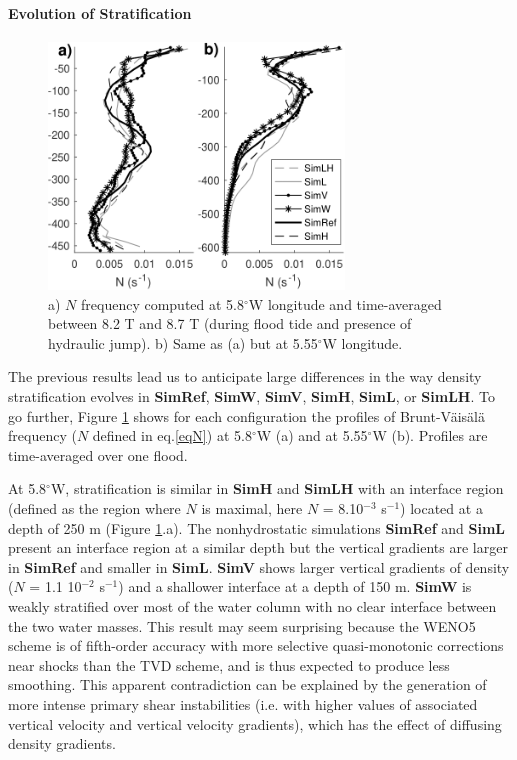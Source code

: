 \paragraph{Evolution of Stratification}

\begin{figure}[!h]
\centering
  \includegraphics[width=0.7\textwidth]{./GBR2D/figure13.png}
  \caption [$N$ frequency ime-averaged during flood tide.]{a) $N$ frequency computed at 5.8$^\circ$W longitude and time-averaged between 8.2 T and 8.7 T (during flood tide and presence of hydraulic jump). b) Same as (a) but at 5.55$^\circ$W longitude.}
	\label{fig_sensnum2}
\end{figure}

The previous results lead us to anticipate large differences in the way density stratification evolves in \textbf{SimRef}, \textbf{SimW}, \textbf{SimV}, \textbf{SimH}, \textbf{SimL}, or \textbf{SimLH}. To go further, Figure \ref{fig_sensnum2} shows for each configuration the profiles of Brunt-V\"ais\"al\"a frequency ($N$ defined in eq.\ref{eqN}) at 5.8$^\circ$W (a) and at 5.55$^\circ$W (b). Profiles are time-averaged over one flood. 

At 5.8$^\circ$W, stratification is similar in \textbf{SimH} and \textbf{SimLH} with an interface region (defined as the region where $N$ is maximal, here $N$ = 8.10$^{-3}$ s$^{-1}$) located at a depth of 250 m (Figure \ref{fig_sensnum2}.a). The nonhydrostatic simulations \textbf{SimRef} and \textbf{SimL} present an interface region at a similar depth but the vertical gradients are larger in \textbf{SimRef} and smaller in \textbf{SimL}.
\textbf{SimV} shows larger vertical gradients of density ($N$ = 1.1 10$^{-2}$ s$^{-1}$) and a shallower interface at a depth of 150 m. \textbf{SimW} is weakly stratified over most of the water column with no clear interface between the two water masses. This result may seem surprising because the WENO5 scheme is of fifth-order accuracy with more selective quasi-monotonic corrections near shocks than the TVD scheme, and is thus expected to produce less smoothing. This apparent contradiction can be explained by the generation of more intense primary shear instabilities (i.e. with higher values of associated vertical velocity and vertical velocity gradients), which has the effect of diffusing density gradients.

